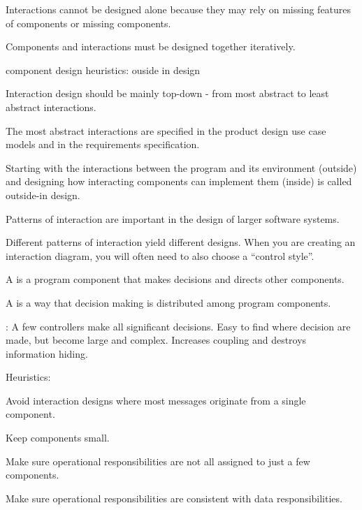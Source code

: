 \begin{compactitem}
\begin{compactitem}
\begin{compactitem}
\item Interactions cannot be designed alone because they may rely on missing features of components or missing components.
\item Components and interactions must be designed together iteratively.
\end{compactitem}
\item component design heuristics: ouside in design
\begin{compactitem}
\item Interaction design should be mainly top-down - from most abstract to least abstract interactions.
\item The most abstract interactions are specified in the product design use case models and in the requirements specification.
\item Starting with the interactions between the program and its environment (outside) and designing how interacting components can implement them (inside) is called outside-in design.
\item Patterns of interaction are important in the design of larger software systems. 
\item Different patterns of interaction yield different designs. When you are creating an interaction diagram, you will often need to also choose a “control style”.
\item A  is a program component that makes decisions and directs other components.
\item A  is a way that decision making is distributed among program components.
\begin{compactitem}
\item {}: A few controllers make all significant decisions. Easy to find where decision are made, but become large and complex. Increases coupling and destroys information hiding.

Heuristics:
\begin{compactitem}
\item Avoid interaction designs where most messages originate from a single component.
\item Keep components small.
\item Make sure operational responsibilities are not all assigned to just a few components.
\item Make sure operational responsibilities are consistent with data responsibilities.
\end{compactitem}


\end{compactitem}
\end{compactitem}
\end{compactitem}
\end{compactitem}
